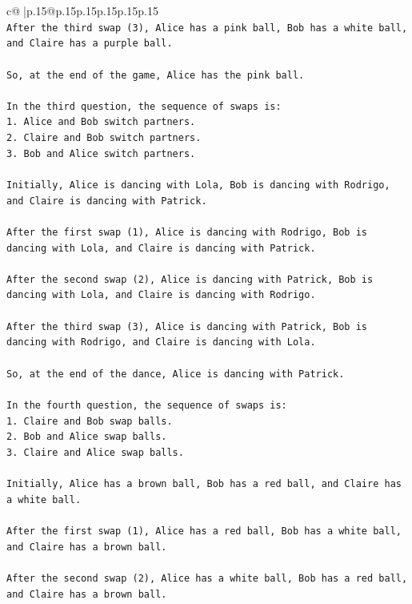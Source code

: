 \documentclass{article}
\begin{document}
{\begin{supertabular}{c@{$\;$}|p{.15\linewidth}@{}p{.15\linewidth}p{.15\linewidth}p{.15\linewidth}p{.15\linewidth}p{.15\linewidth}}
{{{\\ 
\texttt{After the third swap (3), Alice has a pink ball, Bob has a white ball, and Claire has a purple ball.} \\
\\ 
\texttt{So, at the end of the game, Alice has the pink ball.} \\
\\ 
\texttt{In the third question, the sequence of swaps is:} \\
\texttt{1. Alice and Bob switch partners.} \\
\texttt{2. Claire and Bob switch partners.} \\
\texttt{3. Bob and Alice switch partners.} \\
\\ 
\texttt{Initially, Alice is dancing with Lola, Bob is dancing with Rodrigo, and Claire is dancing with Patrick.} \\
\\ 
\texttt{After the first swap (1), Alice is dancing with Rodrigo, Bob is dancing with Lola, and Claire is dancing with Patrick.} \\
\\ 
\texttt{After the second swap (2), Alice is dancing with Patrick, Bob is dancing with Lola, and Claire is dancing with Rodrigo.} \\
\\ 
\texttt{After the third swap (3), Alice is dancing with Patrick, Bob is dancing with Rodrigo, and Claire is dancing with Lola.} \\
\\ 
\texttt{So, at the end of the dance, Alice is dancing with Patrick.} \\
\\ 
\texttt{In the fourth question, the sequence of swaps is:} \\
\texttt{1. Claire and Bob swap balls.} \\
\texttt{2. Bob and Alice swap balls.} \\
\texttt{3. Claire and Alice swap balls.} \\
\\ 
\texttt{Initially, Alice has a brown ball, Bob has a red ball, and Claire has a white ball.} \\
\\ 
\texttt{After the first swap (1), Alice has a red ball, Bob has a white ball, and Claire has a brown ball.} \\
\\ 
\texttt{After the second swap (2), Alice has a white ball, Bob has a red ball, and Claire has a brown ball.} \\
}}}
\end{supertabular}}
\end{document}
